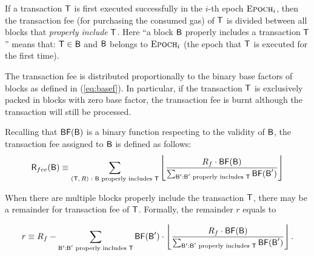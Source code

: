 If a transaction $\textsf{T}$ is first executed successfully in the $i$-th epoch $\textsc{Epoch}_i$, then 
the transaction fee (for purchasing the consumed gas) of $\textsf{T}$ is divided between all blocks that 
\emph{properly include }$\textsf{T}$.
Here ``a block $\textsf{B}$ properly includes a transaction $\textsf{T}$'' means that:
$\textsf{T}\in \textsf{B}$ and $\textsf{B}$ belongs to $\textsc{Epoch}_i$ (the epoch that $\textsf{T}$ is executed for the first time).


The transaction fee is distributed proportionally to the binary base factors of blocks as defined in (\ref{eq:basef}). 
% 
In particular, if the transaction $\textsf{T}$ is exclusively packed in blocks with zero base factor, the transaction fee is burnt although the transaction will still be processed. 

Recalling that $\mathsf{BF}(\textsf{B})$ is a binary function respecting to the validity of $\textsf{B}$,
 the transaction fee assigned to $\textsf{B}$ is defined as follows:
\begin{align}\label{eq:txfee}
	\textsf{R}_{fee}(\textsf{B})\equiv
		 \sum_{\text{$(\textsf{T},R):$ $\textsf{B}$ properly includes $\textsf{T}$}}
		 \left\lfloor
	\frac{R_f \cdot\mathsf{BF}(\textsf{B})}{\sum_{\textsf{B}': \text{$\textsf{B}'$ properly includes $\textsf{T}$}} \mathsf{BF}(\textsf{B}') }
		 \right\rfloor
\end{align}

When there are multiple blocks properly include the transaction $\textsf{T}$, there may be a remainder for transaction fee of $\textsf{T}$. Formally, the remainder $r$ equals to

\begin{align}
	r\equiv R_f - \sum_{\textsf{B}': \text{$\textsf{B}'$ properly includes $\textsf{T}$}} \mathsf{BF}(\textsf{B}') \cdot \left\lfloor\frac{R_f \cdot\mathsf{BF}(\textsf{B})}{\sum_{\textsf{B}': \text{$\textsf{B}'$ properly includes $\textsf{T}$}} \mathsf{BF}(\textsf{B}') }\right\rfloor.
\end{align}

